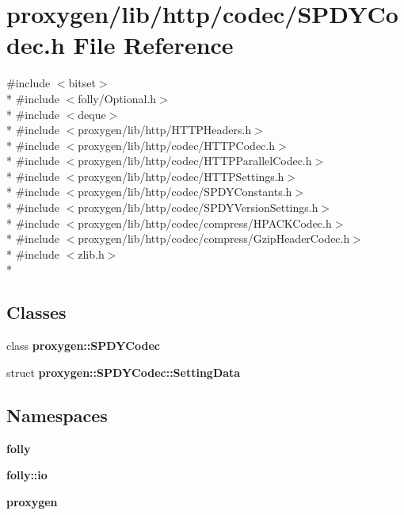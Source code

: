 \section{proxygen/lib/http/codec/\+S\+P\+D\+Y\+Codec.h File Reference}
\label{SPDYCodec_8h}
{\ttfamily \#include $<$bitset$>$}\\*
{\ttfamily \#include $<$folly/\+Optional.\+h$>$}\\*
{\ttfamily \#include $<$deque$>$}\\*
{\ttfamily \#include $<$proxygen/lib/http/\+H\+T\+T\+P\+Headers.\+h$>$}\\*
{\ttfamily \#include $<$proxygen/lib/http/codec/\+H\+T\+T\+P\+Codec.\+h$>$}\\*
{\ttfamily \#include $<$proxygen/lib/http/codec/\+H\+T\+T\+P\+Parallel\+Codec.\+h$>$}\\*
{\ttfamily \#include $<$proxygen/lib/http/codec/\+H\+T\+T\+P\+Settings.\+h$>$}\\*
{\ttfamily \#include $<$proxygen/lib/http/codec/\+S\+P\+D\+Y\+Constants.\+h$>$}\\*
{\ttfamily \#include $<$proxygen/lib/http/codec/\+S\+P\+D\+Y\+Version\+Settings.\+h$>$}\\*
{\ttfamily \#include $<$proxygen/lib/http/codec/compress/\+H\+P\+A\+C\+K\+Codec.\+h$>$}\\*
{\ttfamily \#include $<$proxygen/lib/http/codec/compress/\+Gzip\+Header\+Codec.\+h$>$}\\*
{\ttfamily \#include $<$zlib.\+h$>$}\\*
\subsection*{Classes}
\begin{DoxyCompactItemize}
\item 
class {\bf proxygen\+::\+S\+P\+D\+Y\+Codec}
\item 
struct {\bf proxygen\+::\+S\+P\+D\+Y\+Codec\+::\+Setting\+Data}
\end{DoxyCompactItemize}
\subsection*{Namespaces}
\begin{DoxyCompactItemize}
\item 
 {\bf folly}
\item 
 {\bf folly\+::io}
\item 
 {\bf proxygen}
\end{DoxyCompactItemize}
